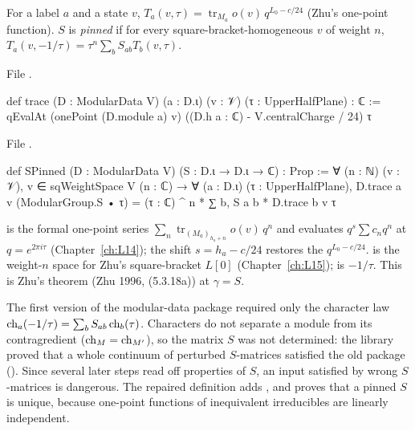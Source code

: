 \begin{definition}\label{l22:def:spin}
For a label $a$ and a state $v$, $T_a(v,\tau)=\operatorname{tr}_{M_a} o(v)\,q^{L_0-c/24}$ (Zhu's one-point
function). $S$ is \emph{pinned} if for every square-bracket-homogeneous $v$ of weight $n$,
$T_a(v,-1/\tau)=\tau^n\sum_b S_{ab}T_b(v,\tau)$.
\end{definition}
\noindent File .
\begin{leancode}
def trace (D : ModularData V) (a : D.ι) (v : 𝒱) (τ : UpperHalfPlane) : ℂ :=
  qEvalAt (onePoint (D.module a) v) ((D.h a : ℂ) - V.centralCharge / 24) τ
\end{leancode}
\noindent File .
\begin{leancode}
def SPinned (D : ModularData V) (S : D.ι → D.ι → ℂ) : Prop :=
  ∀ (n : ℕ) (v : 𝒱), v ∈ sqWeightSpace V (n : ℂ) → ∀ (a : D.ι) (τ : UpperHalfPlane),
    D.trace a v (ModularGroup.S • τ) = (τ : ℂ) ^ n * ∑ b, S a b * D.trace b v τ
\end{leancode}

\begin{dictionary}
 is the formal one-point series $\sum_n \operatorname{tr}_{(M_a)_{h_a+n}}o(v)\,q^n$
and  evaluates $q^{s}\sum c_n q^n$ at $q=e^{2\pi i\tau}$ (Chapter~\ref{ch:L14}); the shift
$s = h_a-c/24$ restores the $q^{L_0-c/24}$.  is the weight-$n$ space for Zhu's
square-bracket $L[0]$ (Chapter~\ref{ch:L15});  is $-1/\tau$. This is Zhu's theorem
(Zhu 1996, (5.3.18a)) at $\gamma=S$.
\end{dictionary}

\begin{warning}[title={The $S$-matrix is not determined by characters}]\label{l22:warn:spin}
The first version of the modular-data package required only the character law
$\operatorname{ch}_a(-1/\tau)=\sum_b S_{ab}\operatorname{ch}_b(\tau)$. Characters do not separate a module from its
contragredient ($\operatorname{ch}_M=\operatorname{ch}_{M'}$), so the matrix $S$ was not determined: the library proved that a
whole continuum of perturbed $S$-matrices satisfied the old package
(). Since several later steps read off
properties of $S$, an input satisfied by wrong $S$-matrices is dangerous. The repaired definition adds
, and  proves that a pinned $S$ is unique, because
one-point functions of inequivalent irreducibles are linearly independent.
\end{warning}

